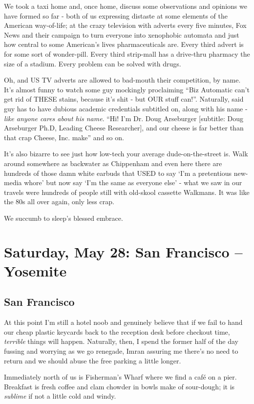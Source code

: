\documentclass[a5paper,titlepage,11pt,draft]{book}
\begin{document}
We took a taxi home and, once home, discuss some observations and opinions we have formed so far - both of us expressing distaste at some elements of the American way-of-life; at the crazy television with adverts every five minutes, Fox News and their campaign to turn everyone into xenophobic automata and just how central to some American's lives pharmaceuticals are.  Every third advert is for some sort of wonder-pill.  Every third strip-mall has a drive-thru pharmacy the size of a stadium.  Every problem can be solved with drugs.

Oh, and US TV adverts are allowed to bad-mouth their competition, by name.  It's almost funny to watch some guy mockingly proclaiming ``Biz Automatic can't get rid of THESE stains, because it's shit - but OUR stuff can!''.  Naturally, said guy has to have dubious academic credentials subtitled on, along with his name - \emph{like anyone cares about his name}. ``Hi! I'm Dr. Doug Arseburger [subtitle: Doug Arseburger Ph.D, Leading Cheese Researcher], and our cheese is far better than that crap Cheese, Inc. make'' and so on.

It's also bizarre to see just how low-tech your average dude-on-the-street is.  Walk around somewhere as backwater as Chippenham and even here there are hundreds of those damn white earbuds that USED to say `I'm a pretentious new-media whore' but now say `I'm the same as everyone else' - what we saw in our travels were hundreds of people still with old-skool cassette Walkmans.  It was like the 80s all over again, only less crap.

We succumb to sleep's blessed embrace.

\chapter[San Francisco -- Yosemite]{Saturday, May 28: San Francisco -- Yosemite}
\section*{San Francisco}
At this point I'm still a hotel noob and genuinely believe that if we fail to hand our cheap plastic keycards back to the reception desk before checkout time, \emph{terrible} things will happen.  Naturally, then, I spend the former half of the day fussing and worrying as we go renegade, Imran assuring me there's no need to return and we should abuse the free parking a little longer.

Immediately north of us is Fisherman's Wharf where we find a caf\'{e} on a pier.  Breakfast is fresh coffee and clam chowder in bowls make of sour-dough; it is \emph{sublime} if not a little cold and windy.
\end{document}
